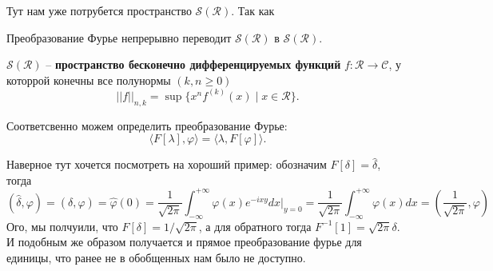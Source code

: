Тут нам уже потрубется пространство $\mathcal{S}(\mathcal{R})$. Так как
\begin{to_def}
	Преобразование Фурье непрерывно переводит $\mathcal{S}(\mathcal{R})$ в $\mathcal{S}(\mathcal{R})$.
\end{to_def}

\begin{to_def}
	$\mathcal{S}(\mathcal{R})$ -- \textbf{пространство бесконечно дифференцируемых функций} $f \colon \mathcal{R} \to \mathcal{C}$, у которрой конечны все полунормы $(k,n \geq 0)$
	\begin{equation*}
		||f||_{n,k} = \sup \{x^n f^{(k)}(x) \mid x \in \mathcal{R}\}.
	\end{equation*}
\end{to_def}

Соответсвенно можем определить преобразование Фурье:
\begin{equation*}
	\langle F[\lambda], \varphi\rangle = \langle \lambda, F[\varphi]\rangle.
\end{equation*}

Наверное тут хочется посмотреть на хороший пример: обозначим $F[\delta] = \hat{\delta}$, тогда
\begin{equation*}
	(\hat{\delta}, \varphi) = (\delta, \hat{\varphi}) = \hat{\varphi}(0) = \frac{1}{\sqrt{2 \pi}} \int_{-\infty}^{+\infty} \varphi(x) e^{- i x y} d x\big|_{y=0} = \frac{1}{\sqrt{2 \pi}} \int_{-\infty}^{+\infty} \varphi(x) d x = \left(\frac{1}{\sqrt{2 \pi}}, \varphi\right)
\end{equation*}
Ого, мы полчуили, что $F[\delta] = 1/\sqrt{2\pi}$, а для обратного тогда $F^{-1}[1] = \sqrt{2\pi}\delta$. И подобным же образом получается и прямое преобразование фурье для единицы, что ранее не в обобщенных нам было не доступно.

